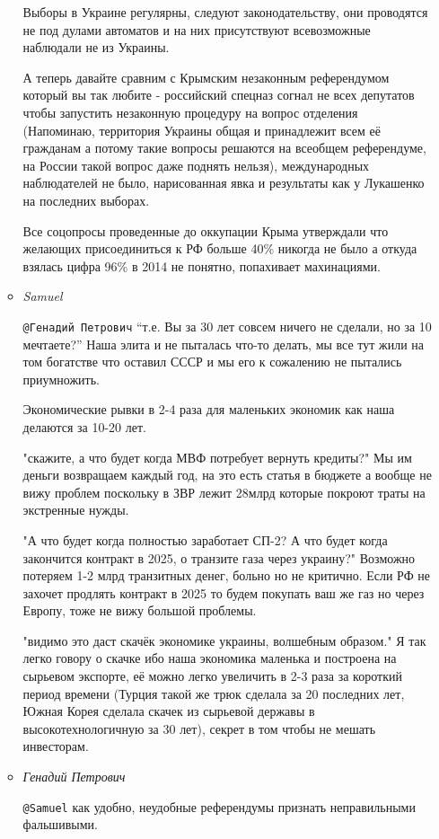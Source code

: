 \begin{itemize}
\begin{itemize}
Выборы в Украине регулярны, следуют законодательству, они проводятся не под
дулами автоматов и на них присутствуют всевозможные наблюдали не из Украины. 

А
теперь давайте сравним с Крымским незаконным референдумом который вы так любите
- российский спецназ согнал не всех депутатов чтобы запустить незаконную
процедуру на вопрос отделения (Напоминаю, территория Украины общая и
принадлежит всем её гражданам а потому такие вопросы решаются на всеобщем
референдуме, на России такой вопрос даже поднять нельзя), международных
наблюдателей не было, нарисованная явка и результаты как у Лукашенко на
последних выборах. 

Все соцопросы проведенные до оккупации Крыма утверждали что желающих
присоединиться к РФ больше 40\% никогда не было а откуда взялась цифра 96\% в
2014 не понятно, попахивает махинациями.

\item \emph{Samuel}

\verb|@Генадий Петрович|  \enquote{т.е. Вы за 30 лет совсем ничего не сделали, но за 10
мечтаете?} Наша элита и не пыталась что-то делать, мы все тут жили на том
богатстве что оставил СССР и мы его к сожалению не пытались приумножить.

Экономические рывки в 2-4 раза для маленьких экономик как наша делаются за
10-20 лет. 

"скажите, а что будет когда МВФ потребует вернуть кредиты?" Мы им деньги
возвращаем каждый год, на это есть статья в бюджете а вообще не вижу проблем
поскольку в ЗВР лежит 28млрд которые покроют траты на экстренные нужды. 

"А что будет когда полностью заработает СП-2? А что будет когда закончится
контракт в 2025, о транзите газа через украину?" Возможно потеряем 1-2 млрд
транзитных денег, больно но не критично. Если РФ не захочет продлять контракт в
2025 то будем покупать ваш же газ но через Европу, тоже не вижу большой
проблемы. 

"видимо это даст скачёк экономике украины, волшебным образом." Я так легко
говору о скачке ибо наша экономика маленька и построена на сырьевом экспорте,
её можно легко увеличить в 2-3 раза за короткий период времени (Турция такой же
трюк сделала за 20 последних лет, Южная Корея сделала скачек из сырьевой
державы в высокотехнологичную за 30 лет), секрет в том чтобы не мешать
инвесторам.

\item \emph{Генадий Петрович}

\verb|@Samuel|  как удобно, неудобные референдумы признать неправильными фальшивыми. 


\end{itemize}
\end{itemize}

